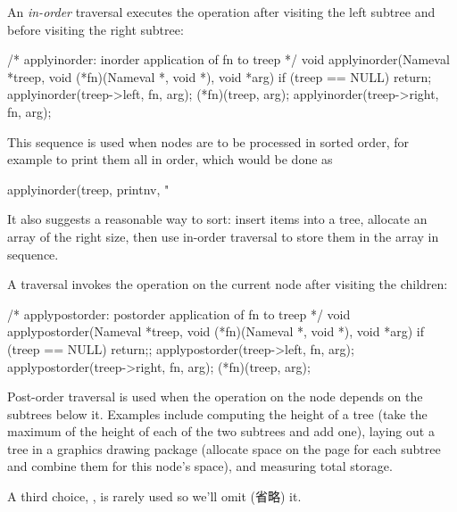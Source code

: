 An \emph{in-order} traversal executes the operation after visiting the left
subtree and before visiting the right subtree:
\begin{wellcode}
    /* applyinorder: inorder application of fn to treep */
    void applyinorder(Nameval *treep,
            void (*fn)(Nameval *, void *), void *arg)
    {
        if (treep == NULL)
            return;
        applyinorder(treep->left, fn, arg);
        (*fn)(treep, arg);
        applyinorder(treep->right, fn, arg);
    }
\end{wellcode}
This sequence is used when nodes are to be processed in sorted order, for
example to print them all in order, which would be done as
\begin{wellcode}
    applyinorder(treep, printnv, "%
\end{wellcode}
It also suggests a reasonable way to sort: insert items into a tree,
allocate an array of the right size, then use in-order traversal to store
them in the array in sequence.

A  traversal invokes the operation on the current node
after visiting the children:
\begin{wellcode}
    /* applypostorder: postorder application of fn to treep */
    void applypostorder(Nameval *treep,
            void (*fn)(Nameval *, void *), void *arg)
    {
        if (treep == NULL)
            return;;
        applypostorder(treep->left, fn, arg);
        applypostorder(treep->right, fn, arg);
        (*fn)(treep, arg);
    }
\end{wellcode}
Post-order traversal is used when the operation on the node depends
on the subtrees below it. Examples include computing the height of
a tree (take the maximum of the height of each of the two subtrees
and add one), laying out a tree in a graphics drawing package (allocate
space on the page for each subtree and combine them for this
node's space), and measuring total storage.

A third choice, , is rarely used so we'll omit (省略) it.

